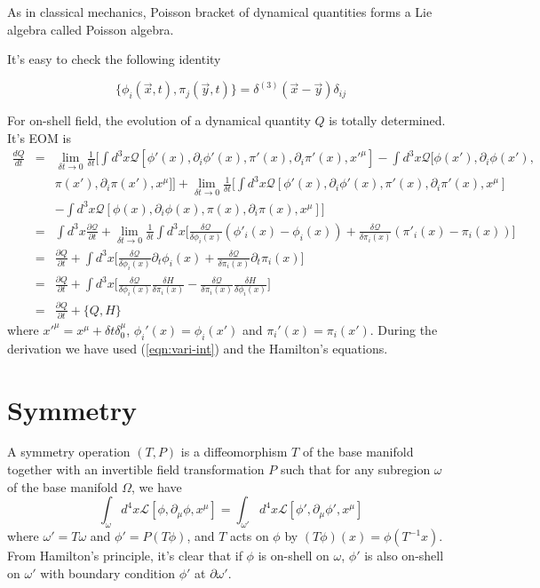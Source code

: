 \documentclass[12pt]{book}
\begin{document}
	As in classical mechanics, Poisson bracket of dynamical quantities forms a Lie algebra called Poisson algebra.
	
	It's easy to check the following identity
	
	\begin{equation}
		\{\phi_i(\vec x,t),\pi_j(\vec y,t)\}=\delta^{(3)}(\vec x-\vec y)\delta_{ij}
	\end{equation}
	
	For on-shell field, the evolution of a dynamical quantity $Q$ is totally determined. It's EOM is
	\begin{eqnarray}
		\frac{dQ}{dt} &=&\lim_{\delta t\rightarrow 0}\frac 1 {\delta t}\bigg[\int d^3x\mathcal{Q}[\phi'(x),\partial_i\phi'(x),\pi'(x),\partial_i\pi'(x),x'^\mu]-\int d^3x\mathcal{Q}[\phi(x'),\partial_i\phi(x'), \nonumber\\
		&&\pi(x'),\partial_i\pi(x'),x^\mu]\bigg]+\lim_{\delta t\rightarrow 0}\frac 1 {\delta t}\bigg[\int d^3x\mathcal{Q}[\phi'(x),\partial_i\phi'(x),\pi'(x),\partial_i\pi'(x),x^\mu]\nonumber\\
		&&-\int d^3x\mathcal{Q}[\phi(x),\partial_i\phi(x),\pi(x),\partial_i\pi(x),x^\mu]\bigg]\\
		&=&\int d^3x\frac{\partial \mathcal{Q}}{\partial t}+\lim_{\delta t\rightarrow 0}\frac 1 {\delta t}\int d^3x\Big[\frac{\delta \mathcal{Q}}{\delta \phi_i(x)}(\phi'_i(x)-\phi_i(x))+\frac{\delta \mathcal{Q}}{\delta \pi_i(x)}(\pi'_i(x)-\pi_i(x))\Big] \\
		&=&\frac{\partial Q}{\partial t}+\int d^3x\Big[\frac{\delta \mathcal{Q}}{\delta \phi_i(x)}\partial_t\phi_i(x)+\frac{\delta \mathcal{Q}}{\delta \pi_i(x)}\partial_t\pi_i(x)\Big] \\
		&=&\frac{\partial Q}{\partial t}+\int d^3x\Big[\frac{\delta \mathcal{Q}}{\delta \phi_i(x)}\frac{\delta H}{\delta\pi_i(x)}-\frac{\delta \mathcal{Q}}{\delta \pi_i(x)}\frac{\delta H}{\delta\phi_i(x)}\Big] \\
		&=&\frac{\partial Q}{\partial t}+\{Q,H\}
	\end{eqnarray}
	where $x'^\mu=x^\mu+\delta t\delta^\mu_0$, $\phi_i'(x)=\phi_i(x')$ and $\pi_i'(x)=\pi_i(x')$. During the derivation we have used (\ref{eqn:vari-int}) and the Hamilton's equations.
	\section{Symmetry}
	A symmetry operation $(T,P)$ is a diffeomorphism $T$ of the base manifold together with an invertible field transformation $P$ such that for any subregion $\omega$ of the base manifold $\Omega$, we have
	\begin{equation}
		\int_{\omega}d^4x\mathcal{L}[\phi,\partial_\mu\phi,x^\mu]=\int_{\omega'}d^4x\mathcal{L}[\phi',\partial_\mu\phi',x^\mu]
	\end{equation}
	where $\omega'=T\omega$ and $\phi'=P(T\phi)$, and $T$ acts on $\phi$ by $(T\phi)(x)=\phi(T^{-1}x)$. From Hamilton's principle, it's clear that if $\phi$ is on-shell on $\omega$, $\phi'$ is also on-shell on $\omega'$ with boundary condition $\phi'$ at $\partial\omega'$.
\end{document}
